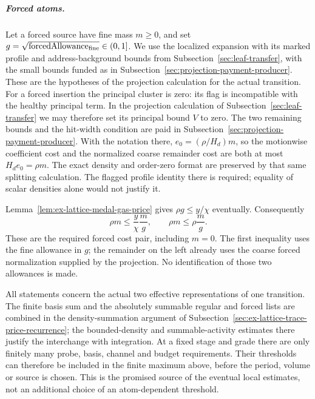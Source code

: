 \subparagraph{Forced atoms.}
Let a forced source have fine mass $m\ge0$, and set
$g=\sqrt{\operatorname{forcedAllowance}_{\rm fine}}\in(0,1]$.
We use the localized expansion with its marked profile and
address-background bounds from Subsection~\ref{sec:leaf-transfer}, with
the small bounds funded as in Subsection~\ref{sec:projection-payment-producer}.
These are the hypotheses of the projection calculation for the actual
transition. For a forced insertion the principal cluster is zero: its flag is
incompatible with the healthy principal term. In the projection
calculation of Subsection~\ref{sec:leaf-transfer} we may therefore set
its principal bound $V$ to zero. The two remaining bounds and the
hit-width condition are paid in
Subsection~\ref{sec:projection-payment-producer}. With the notation
there, $e_0=(\rho/H_d)m$, so the motionwise coefficient cost and
the normalized coarse remainder cost are both at most
$H_de_0=\rho m$. The exact density and order-zero format are preserved
by that same splitting calculation. The flagged profile identity there
is required; equality of scalar densities alone would not justify it.

Lemma~\ref{lem:ex-lattice-medal-gas-price} gives
$\rho g\le y/\chi$ eventually. Consequently
\[
 \rho m\le\frac y\chi\frac m g,
 \qquad \rho m\le\rho\frac m g.
\]
These are the required forced cost pair, including $m=0$.
The first inequality uses the fine allowance in $g$; the remainder
on the left already uses the coarse forced normalization supplied by
the projection. No identification of those two allowances is made.

All statements concern the actual two effective representations of one
transition. The finite basis sum and the absolutely summable regular
and forced lists are combined in the density-summation argument of
Subsection~\ref{sec:ex-lattice-trace-price-recurrence}; the bounded-density
and summable-activity estimates there justify the interchange with
integration. At a fixed stage and grade there are only finitely many
probe, basis, channel and budget requirements. Their thresholds can
therefore be included in the finite maximum above, before the period,
volume or source is chosen. This is the promised source of the eventual
local estimates, not an additional choice of an atom-dependent threshold.
